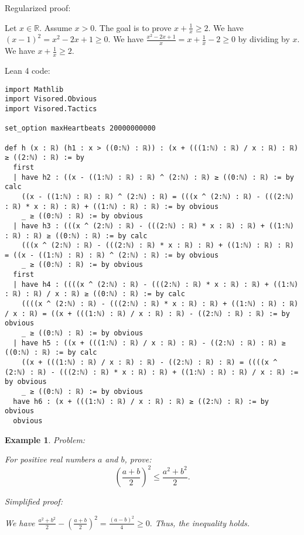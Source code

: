 \documentclass{article}
\newtheorem{example}{Example}
\begin{document}
Regularized proof:
\begin{tcolorbox}[colback=red!10, width=\linewidth]
Let $x\in\mathbb{R}$. Assume $x>0$.
The goal is to prove $x + \frac{1}{x} \ge 2$.
We have ${\left(x-1\right)}^2 = x^2 - 2x + 1 \ge 0$.
We have $\frac{x^2 - 2x + 1}{x} = x + \frac{1}{x} - 2 \ge 0$ by dividing by $x$.
We have $x + \frac{1}{x} \ge 2$.
\end{tcolorbox}

Lean 4 code:
\begin{tcolorbox}[colback=white!10, width=\linewidth]
\begin{lstlisting}[language=Lean4]
import Mathlib
import Visored.Obvious
import Visored.Tactics

set_option maxHeartbeats 20000000000

def h (x : ℝ) (h1 : x > ((0:ℕ) : ℝ)) : (x + (((1:ℕ) : ℝ) / x : ℝ) : ℝ) ≥ ((2:ℕ) : ℝ) := by
  first
  | have h2 : ((x - ((1:ℕ) : ℝ) : ℝ) ^ (2:ℕ) : ℝ) ≥ ((0:ℕ) : ℝ) := by calc
    ((x - ((1:ℕ) : ℝ) : ℝ) ^ (2:ℕ) : ℝ) = (((x ^ (2:ℕ) : ℝ) - (((2:ℕ) : ℝ) * x : ℝ) : ℝ) + ((1:ℕ) : ℝ) : ℝ) := by obvious
    _ ≥ ((0:ℕ) : ℝ) := by obvious
  | have h3 : (((x ^ (2:ℕ) : ℝ) - (((2:ℕ) : ℝ) * x : ℝ) : ℝ) + ((1:ℕ) : ℝ) : ℝ) ≥ ((0:ℕ) : ℝ) := by calc
    (((x ^ (2:ℕ) : ℝ) - (((2:ℕ) : ℝ) * x : ℝ) : ℝ) + ((1:ℕ) : ℝ) : ℝ) = ((x - ((1:ℕ) : ℝ) : ℝ) ^ (2:ℕ) : ℝ) := by obvious
    _ ≥ ((0:ℕ) : ℝ) := by obvious
  first
  | have h4 : ((((x ^ (2:ℕ) : ℝ) - (((2:ℕ) : ℝ) * x : ℝ) : ℝ) + ((1:ℕ) : ℝ) : ℝ) / x : ℝ) ≥ ((0:ℕ) : ℝ) := by calc
    ((((x ^ (2:ℕ) : ℝ) - (((2:ℕ) : ℝ) * x : ℝ) : ℝ) + ((1:ℕ) : ℝ) : ℝ) / x : ℝ) = ((x + (((1:ℕ) : ℝ) / x : ℝ) : ℝ) - ((2:ℕ) : ℝ) : ℝ) := by obvious
    _ ≥ ((0:ℕ) : ℝ) := by obvious
  | have h5 : ((x + (((1:ℕ) : ℝ) / x : ℝ) : ℝ) - ((2:ℕ) : ℝ) : ℝ) ≥ ((0:ℕ) : ℝ) := by calc
    ((x + (((1:ℕ) : ℝ) / x : ℝ) : ℝ) - ((2:ℕ) : ℝ) : ℝ) = ((((x ^ (2:ℕ) : ℝ) - (((2:ℕ) : ℝ) * x : ℝ) : ℝ) + ((1:ℕ) : ℝ) : ℝ) / x : ℝ) := by obvious
    _ ≥ ((0:ℕ) : ℝ) := by obvious
  have h6 : (x + (((1:ℕ) : ℝ) / x : ℝ) : ℝ) ≥ ((2:ℕ) : ℝ) := by obvious
  obvious

\end{lstlisting}
\end{tcolorbox}


\begin{example}
Problem:
\begin{tcolorbox}[colback=yellow!10, width=\linewidth]
For positive real numbers $a$ and $b$, prove:
    $$\left(\frac{a+b}{2}\right)^2 \leq \frac{a^2+b^2}{2}.$$
\end{tcolorbox}

Simplified proof:
\begin{tcolorbox}[colback=blue!10, width=\linewidth]
We have
$ \frac{a^2+b^2}{2} - \left(\frac{a+b}{2}\right)^2 = \frac{(a-b)^2}{4} \ge 0. $
Thus, the inequality holds.
\end{tcolorbox}
\end{example}
\end{document}
